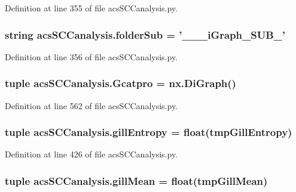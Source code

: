 Definition at line 355 of file acs\-S\-C\-Canalysis.\-py.

\hypertarget{a00097_a90c2bcabbdb271c2c3347ebea4c259bc}{
\subsubsection[{folder\-Sub}]{\setlength{\rightskip}{0pt plus 5cm}string acs\-S\-C\-Canalysis.\-folder\-Sub = '\-\_\-\-\_\-\_\-i\-Graph\-\_\-\-S\-U\-B\-\_\-'}}\label{a00097_a90c2bcabbdb271c2c3347ebea4c259bc}


Definition at line 356 of file acs\-S\-C\-Canalysis.\-py.

\hypertarget{a00097_ad88c3dd8eb89ddbe8720462b03f35003}{
\subsubsection[{Gcatpro}]{\setlength{\rightskip}{0pt plus 5cm}tuple acs\-S\-C\-Canalysis.\-Gcatpro = nx.\-Di\-Graph()}}\label{a00097_ad88c3dd8eb89ddbe8720462b03f35003}


Definition at line 562 of file acs\-S\-C\-Canalysis.\-py.

\hypertarget{a00097_a4c214eb4f6812d6182bae32715bce3ad}{
\subsubsection[{gill\-Entropy}]{\setlength{\rightskip}{0pt plus 5cm}tuple acs\-S\-C\-Canalysis.\-gill\-Entropy = float(tmp\-Gill\-Entropy)}}\label{a00097_a4c214eb4f6812d6182bae32715bce3ad}


Definition at line 426 of file acs\-S\-C\-Canalysis.\-py.

\hypertarget{a00097_a4e862896701636d17752f14810ff687f}{
\subsubsection[{gill\-Mean}]{\setlength{\rightskip}{0pt plus 5cm}tuple acs\-S\-C\-Canalysis.\-gill\-Mean = float(tmp\-Gill\-Mean)}}\label{a00097_a4e862896701636d17752f14810ff687f}


